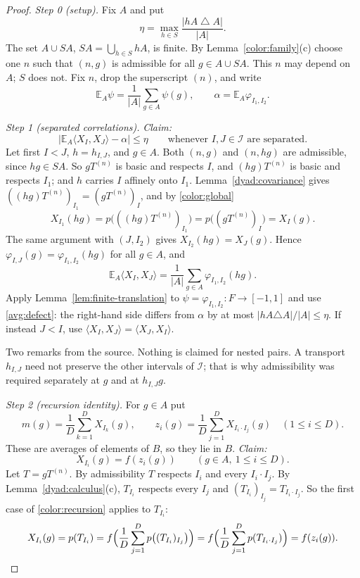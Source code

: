 \documentclass[11pt]{article}
\newcommand{\ip}[2]{\langle #1,#2\rangle}
\newcommand{\cI}{\mathcal I}
\newcommand{\EA}{\mathbb E_A}
\theoremstyle{definition}
\numberwithin{equation}{section}
\begin{document}
\begin{proof}
\emph{Step 0 (setup).} Fix \(A\) and put
\begin{equation}\label{avg:defect}
  \eta=\max_{h\in S}\frac{|hA\mathbin{\triangle}A|}{|A|}.
\end{equation}
The set \(A\cup SA\), \(SA=\bigcup_{h\in S}hA\), is finite. By
Lemma~\ref{color:family}(c) choose one \(n\) such that \((n,g)\) is
admissible for all \(g\in A\cup SA\). This \(n\) may depend on \(A\);
\(S\) does not. Fix \(n\), drop the superscript \((n)\), and write
\[
  \EA\psi=\frac1{|A|}\sum_{g\in A}\psi(g),
  \qquad
  \alpha=\EA\varphi_{I_1,I_2}.
\]

\emph{Step 1 (separated correlations).} \emph{Claim:}
\begin{equation}\label{avg:correlation}
  \bigl|\EA\ip{X_I}{X_J}-\alpha\bigr|\le\eta
  \qquad\text{whenever \(I,J\in\cI\) are separated.}
\end{equation}
Let first \(I<J\), \(h=h_{I,J}\), and \(g\in A\). Both \((n,g)\) and
\((n,hg)\) are admissible, since \(hg\in SA\). So \(gT^{(n)}\) is basic
and respects \(I\), and \((hg)T^{(n)}\) is basic and respects \(I_1\); and
\(h\) carries \(I\) affinely onto \(I_1\).
Lemma~\ref{dyad:covariance} gives
\(((hg)T^{(n)})_{I_1}=(gT^{(n)})_I\), and by \eqref{color:global}
\[
  X_{I_1}(hg)=p\bigl(((hg)T^{(n)})_{I_1}\bigr)
             =p\bigl((gT^{(n)})_I\bigr)=X_I(g).
\]
The same argument with \((J,I_2)\) gives \(X_{I_2}(hg)=X_J(g)\). Hence
\(\varphi_{I,J}(g)=\varphi_{I_1,I_2}(hg)\) for all \(g\in A\), and
\[
  \EA\ip{X_I}{X_J}=\frac1{|A|}\sum_{g\in A}\varphi_{I_1,I_2}(hg).
\]
Apply Lemma~\ref{lem:finite-translation} to
\(\psi=\varphi_{I_1,I_2}:F\to[-1,1]\) and use \eqref{avg:defect}: the
right-hand side differs from \(\alpha\) by at most
\(|hA\triangle A|/|A|\le\eta\). If instead \(J<I\), use
\(\ip{X_I}{X_J}=\ip{X_J}{X_I}\).

Two remarks from the source. Nothing is claimed for nested pairs. A
transport \(h_{I,J}\) need not preserve the other intervals of \(\cI\);
that is why admissibility was required separately at \(g\) and at
\(h_{I,J}g\).

\emph{Step 2 (recursion identity).} For \(g\in A\) put
\[
  m(g)=\frac1D\sum_{k=1}^D X_{I_k}(g),\qquad
  z_i(g)=\frac1D\sum_{j=1}^D X_{I_i\cdot I_j}(g)
       \quad(1\le i\le D).
\]
These are averages of elements of \(B\), so they lie in \(B\).
\emph{Claim:}
\begin{equation}\label{avg:recursive-identity}
  X_{I_i}(g)=f(z_i(g))\qquad(g\in A,\ 1\le i\le D).
\end{equation}
Let \(T=gT^{(n)}\). By admissibility \(T\) respects \(I_i\) and every
\(I_i\cdot I_j\). By Lemma~\ref{dyad:calculus}(c), \(T_{I_i}\) respects
every \(I_j\) and \((T_{I_i})_{I_j}=T_{I_i\cdot I_j}\). So the first case
of \eqref{color:recursion} applies to \(T_{I_i}\):
\[
  X_{I_i}(g)=p(T_{I_i})
  =f\Bigl(\frac1D\sum_{j=1}^Dp\bigl((T_{I_i})_{I_j}\bigr)\Bigr)
  =f\Bigl(\frac1D\sum_{j=1}^Dp(T_{I_i\cdot I_j})\Bigr)
  =f(z_i(g)).
\]


\end{proof}
\end{document}

